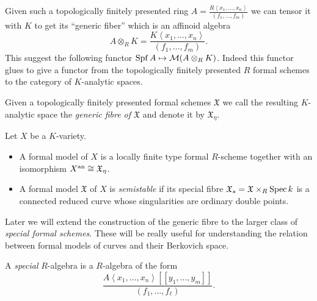 Given such a topologically finitely presented ring $A = \frac{R \left<x_1, \ldots, x_n \right>}{(f_1, \ldots, f_m)}$ we can tensor it with $K$ to get its ``generic fiber'' which is an affinoid algebra \[
A \otimes _R K = \frac{K \left<x_1, \ldots, x_n \right>}{(f_1, \ldots, f_m)}
.\]  
This suggest the following functor $\operatorname{Spf} A \mapsto \mathcal{M} (A \otimes_R K)$. 
Indeed this functor glues to give a functor from the topologically finitely presented $R$ formal schemes to the category of $K$-analytic spaces. 

\begin{definition}\label{def:generic_fibre_of_formal_scheme}
Given a topologically finitely presented formal schemes $\mathfrak{X} $ we call the resulting $K$-analytic space the \emph{generic fibre of  $\mathfrak{X} $} and denote it by $\mathfrak{X} _\eta$. 
\end{definition}

\begin{definition}
	Let $X$ be a $K$-variety. 
	\begin{itemize}
		\item A formal model of $X$ is a locally finite type formal $R$-scheme together with an isomorphism $X{}^{\text{an}} \cong \mathfrak{X}_{\eta}$.
		\item A formal model $\mathfrak{X}  $ of $X$ is \emph{semistable} if its special fibre $\mathfrak{X} _s = \mathfrak{X} \times_R \operatorname{Spec} k$ is a connected reduced curve whose singularities are ordinary double points. 
	\end{itemize}
\end{definition}

Later we will extend the construction of the generic fibre to the larger class of \emph{special formal schemes}.
These will be really useful for understanding the relation between formal models of curves and their Berkovich space. 
\begin{definition}\label{def:special_r_algebra}
	A \emph{special} $R$-algebra is a $R$-algebra of the form \[
		\frac{A\left<x_1, \ldots, x_n \right>[[y_1, \ldots, y_m]]}{(f_1, \ldots, f_\ell)}
	.\] 
\end{definition}






